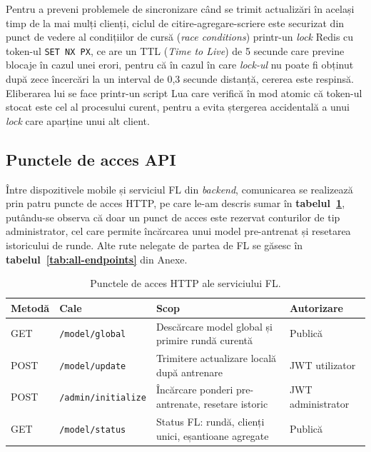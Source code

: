 \documentclass[12pt,a4paper]{report}
\begin{document}
Pentru a preveni problemele de sincronizare când se trimit actualizări în același timp de la mai mulți clienți, ciclul de citire-agregare-scriere este securizat din punct de vedere al condițiilor de cursă (\textit{race conditions}) printr-un \textit{lock} Redis cu token-ul \texttt{SET NX PX}, ce are un TTL (\textit{Time to Live}) de 5 secunde care previne blocaje în cazul unei erori, pentru că în cazul în care \textit{lock-ul} nu poate fi obținut după zece încercări la un interval de 0,3 secunde distanță, cererea este respinsă. Eliberarea lui se face printr-un script Lua care verifică în mod atomic că token-ul stocat este cel al procesului curent, pentru a evita ștergerea accidentală a unui \textit{lock} care aparține unui alt client.

\subsection{Punctele de acces API}

Între dispozitivele mobile și serviciul FL din \textit{backend}, comunicarea se realizează prin patru puncte de acces HTTP, pe care le-am descris sumar în \textbf{tabelul~\ref{tab:fl-endpoints}}, putându-se observa că doar un punct de acces este rezervat conturilor de tip administrator, cel care permite încărcarea unui model pre-antrenat și resetarea istoricului de runde. Alte rute nelegate de partea de FL se găsesc în \textbf{tabelul~\ref{tab:all-endpoints}} din Anexe.

\begin{table}[h]
\centering
\scriptsize
\caption{Punctele de acces HTTP ale serviciului FL.}
\label{tab:fl-endpoints}
\begin{tabular}{|l|p{3cm}|p{5.5cm}|p{2.5cm}|}
\hline
\textbf{Metodă} & \textbf{Cale} & \textbf{Scop} & \textbf{Autorizare} \\
\hline
GET & \texttt{/model/global} & Descărcare model global și primire rundă curentă & Publică \\
\hline
POST & \texttt{/model/update} & Trimitere actualizare locală după antrenare & JWT utilizator \\
\hline
POST & \texttt{/admin/initialize} & Încărcare ponderi pre-antrenate, resetare istoric & JWT administrator \\
\hline
GET & \texttt{/model/status} & Status FL: rundă, clienți unici, eșantioane agregate & Publică \\
\hline
\end{tabular}
\end{table}
\end{document}
